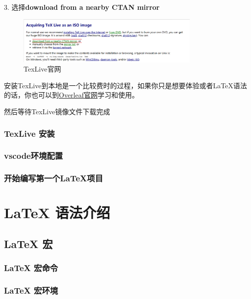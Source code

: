 \documentclass[cn,10pt,math=newtx,citestyle=gb7714-2015,bibstyle=gb7714-2015]{elegantbook}
\begin{document}
    3. 选择\textbf{download from a nearby CTAN mirror}

    \begin{figure}[H]
        \centering
        \includegraphics[width=0.8\textwidth]{images/shapshot_install_3.png}
        \caption{TexLive官网}
        \label{shapshot_install_3}
    \end{figure}

    \begin{note}
        安装TexLive到本地是一个比较费时的过程，如果你只是想要体验或者\LaTeX{}语法的话，你也可以到\href{https://www.overleaf.com/}{Overleaf官网}学习和使用。
    \end{note}

    然后等待TexLive镜像文件下载完成

    \subsection{TexLive 安装}

    \subsection{vscode环境配置}

    \subsection{开始编写第一个\LaTeX{}项目}

    \chapter{\LaTeX{} 语法介绍}

    \section{\LaTeX{} 宏}

    \subsection{\LaTeX{} 宏命令}

    \subsection{\LaTeX{} 宏环境}
\end{document}
